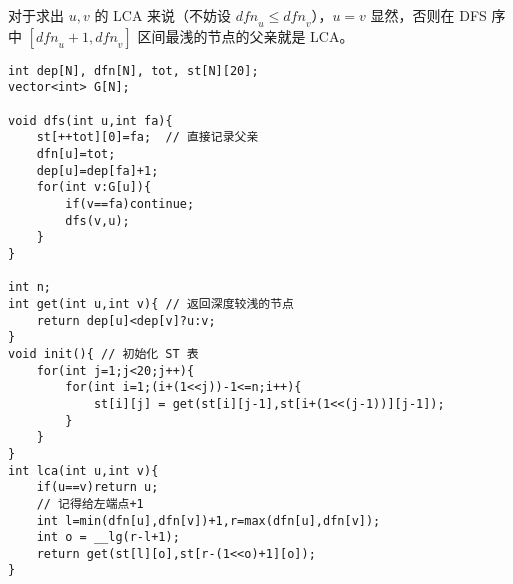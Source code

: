 对于求出 $u,v$ 的 LCA 来说（不妨设 $\textit{dfn}_u\le \textit{dfn}_v$），$u=v$ 显然，否则在 DFS 序中 $[\textit{dfn}_u+1,\textit{dfn}_v]$ 区间最浅的节点的父亲就是 LCA。
\begin{verbatim}
int dep[N], dfn[N], tot, st[N][20];
vector<int> G[N];

void dfs(int u,int fa){
    st[++tot][0]=fa;  // 直接记录父亲
    dfn[u]=tot;
    dep[u]=dep[fa]+1;
    for(int v:G[u]){
        if(v==fa)continue;
        dfs(v,u);
    }
}
 
int n;
int get(int u,int v){ // 返回深度较浅的节点
    return dep[u]<dep[v]?u:v;
}
void init(){ // 初始化 ST 表
    for(int j=1;j<20;j++){
        for(int i=1;(i+(1<<j))-1<=n;i++){
            st[i][j] = get(st[i][j-1],st[i+(1<<(j-1))][j-1]);
        }
    }
}
int lca(int u,int v){
    if(u==v)return u;
    // 记得给左端点+1
    int l=min(dfn[u],dfn[v])+1,r=max(dfn[u],dfn[v]);
    int o = __lg(r-l+1);
    return get(st[l][o],st[r-(1<<o)+1][o]);
}
\end{verbatim}